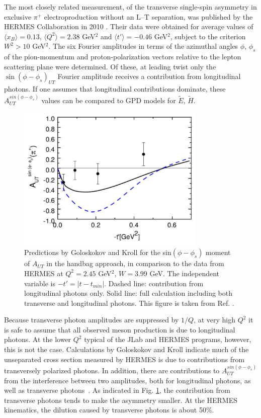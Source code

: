 The most closely related measurement, of the transverse single-spin asymmetry
in exclusive $\pi^+$ electroproduction without an L--T separation, was
published by the HERMES Collaboration in 2010 \cite{hermes10}.  Their data were
obtained for average values of $\langle x_B \rangle =0.13$, $\langle Q^2 \rangle
=2.38$ GeV$^2$ and $\langle t' \rangle = -0.46$ GeV$^2$, subject to the
criterion $W^2>10$ GeV$^2$.  The six Fourier amplitudes in terms of the
azimuthal angles $\phi$, $\phi_s$ of the pion-momentum and proton-polarization
vectors relative to the lepton scattering plane were determined.  Of these, at
leading twist only the $\sin(\phi-\phi_s)_{UT}$ Fourier amplitude receives a
contribution from longitudinal photons.  If one assumes that longitudinal
contributions dominate, these $A_{UT}^{sin(\phi-\phi_s)}$ values can be
compared to GPD models for $\tilde{E}$, $\tilde{H}$.

\begin{figure}[hbt!]
\begin{center}
\includegraphics[height=7cm]{./figures/hermes_Aut.pdf}
\end{center}
\caption{\label{fig:hermes_aut}
Predictions by Goloskokov and Kroll for the sin$(\phi-\phi_s)$ moment of
$A_{UT}$ in the handbag approach, in comparison to the data from HERMES at
$Q^2=2.45$ GeV$^2$, $W=3.99$ GeV.  The independent variable is
$-t'=|t-t_{min}|$.  Dashed line: contribution from longitudinal photons only.
Solid line: full calculation including both transverse and longitudinal
photons.  This figure is taken from Ref. .}
\end{figure}

Because transverse photon amplitudes are suppressed by $1/Q$, at very high
$Q^2$ it is safe to assume that all observed meson production is due to
longitudinal photons.  At the lower $Q^2$ typical of the JLab and HERMES
programs, however, this is not the case.  Calculations by Goloskokov and Kroll
\cite{Go10} indicate much of the unseparated cross section measured by HERMES
\cite{hermes10} is due to contributions from transversely polarized photons.
In addition, there are contributions to $A_{UT}^{sin(\phi-\phi_s)}$ from the
interference between two amplitudes, both for longitudinal photons, as well as
transverse photons~\cite{Di05}.  As indicated in Fig. \ref{fig:hermes_aut}, the
contribution from transverse photons tends to make the asymmetry smaller.  At
the HERMES kinematics, the dilution caused by transverse photons is about
50\%.

